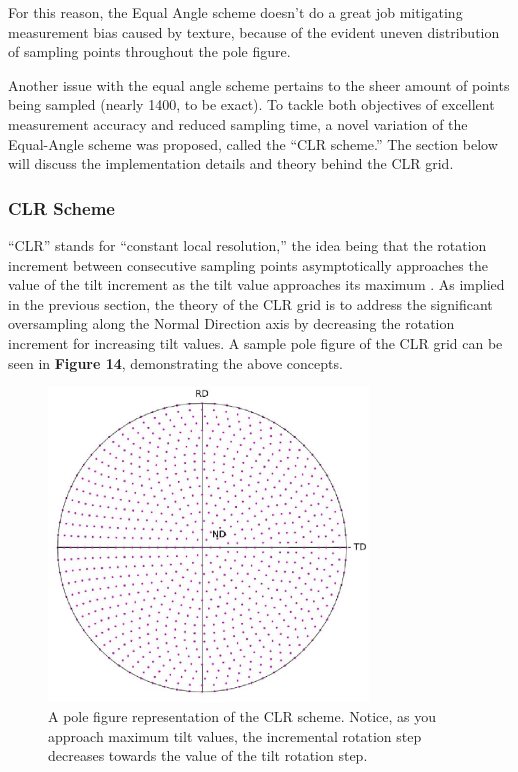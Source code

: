 \documentclass[10pt]{article}
\begin{document}
For this reason, the 
Equal Angle scheme doesn’t do a great job mitigating measurement bias caused by texture, because of the evident 
uneven distribution of sampling points throughout the pole figure. 

Another issue with the equal angle scheme pertains to the sheer amount of points being sampled (nearly 1400, to be exact). To tackle both objectives of excellent
measurement accuracy and reduced sampling time, 
a novel variation of the Equal-Angle scheme was proposed, 
called the “CLR scheme.” The section below will discuss the implementation details and theory behind the CLR grid.

\subsubsection{CLR Scheme}
“CLR” stands for “constant local resolution,” the idea being that 
the rotation increment between consecutive sampling points asymptotically approaches the 
value of the tilt increment as the tilt value approaches its maximum \cite{ref11}. As implied in the previous section, the theory of the CLR grid
is to address the significant oversampling along the Normal Direction axis by decreasing the rotation increment for increasing tilt values.
A sample pole figure of the CLR grid can be seen in \textbf{Figure 14}, demonstrating the above concepts.
\begin{figure}[h]
    \centering
    \includegraphics[width=8.5cm]{fig14}
    \caption{\label{tab1}A pole figure representation of the CLR scheme. Notice, as you approach maximum tilt values, 
    the incremental rotation step decreases towards the value of the tilt rotation step.} 
    \end{figure}
\end{document}
